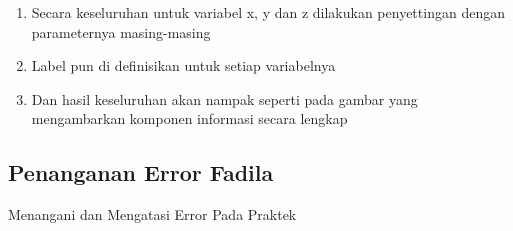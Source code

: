 \begin{enumerate}
\begin{enumerate}
\item Secara keseluruhan untuk variabel x, y dan z dilakukan penyettingan dengan parameternya masing-masing
\item Label pun di definisikan untuk setiap variabelnya
\item Dan hasil keseluruhan akan nampak seperti pada gambar yang mengambarkan komponen informasi secara lengkap
\end{enumerate}
\par
\par
\par
\end{enumerate}


\par
\par
\par
\subsection{Penanganan Error Fadila}
Menangani dan Mengatasi Error Pada Praktek

